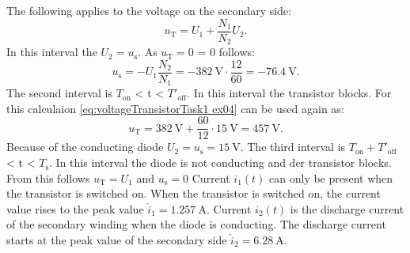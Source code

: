 \begin{solutionblock}
    The following applies to the voltage on the secondary side:
    \begin{equation}
        u_\mathrm{T} = U_1 + \frac{N_1}{N_2}U_\mathrm{2}.\label{eq:voltageTransistorTask1 ex04}
    \end{equation}
    In this interval the $U_\mathrm{2} = u_\mathrm{s}$. As $u_\mathrm{T}=0$ = 0 follows:
    \begin{equation}
        u_\mathrm{s} = -U_1 \frac{N_2}{N_1} = -\SI{382}{\volt}\cdot\frac{12}{60} = \SI{-76.4}{\volt}.
    \end{equation}
    The second interval is $T_\mathrm{on}$ < t < $T'_\mathrm{off}$. In this interval the transistor blocks. For this calculaion \eqref{eq:voltageTransistorTask1 ex04} can be used again as:
    \begin{equation}
        u_\mathrm{T} = \SI{382}{\volt} + \frac{60}{12}\cdot\SI{15}{\volt} = \SI{457}{\volt}.
    \end{equation}
    Because of the conducting diode $U_\mathrm{2} = u_\mathrm{s} = \SI{15}{\volt}$.
    The third interval is $T_\mathrm{on}+T'_\mathrm{off}$ < t < $T_\mathrm{s}$. In this interval the diode is not conducting and der transistor blocks. From this follows $u_\mathrm{T} = U_1$ and $u_\mathrm{s}=0$
    Current $i_\mathrm{1}(t)$ can only be present when the transistor is switched on. When the transistor is switched on, the current value rises to the peak value $\hat i_\mathrm{1}= \SI{1.257}{\ampere}$. Current $i_\mathrm{2}(t)$ is the discharge current of the secondary winding when the diode is conducting. The discharge current starts at the peak value of the secondary side $\hat i_\mathrm{2}= \SI{6.28}{\ampere}$.
    
    
\end{solutionblock}



